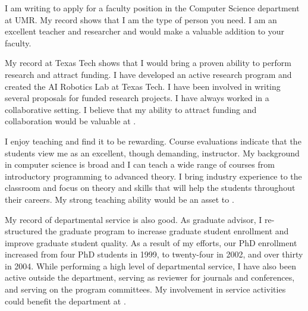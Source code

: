 

I am writing to apply for a faculty position in the Computer Science
 department at UMR.  My record
shows that I am the type of person you need.  I am an excellent teacher and
researcher and would make a valuable addition to your faculty.

\thecustom

My record at Texas Tech shows that I would bring a proven ability to perform
research and attract funding.  I have developed an active research program
and created the AI Robotics Lab at Texas Tech.  I have been involved in
writing several proposals for funded research projects.  I have always
worked in a collaborative setting.  I believe that my ability to attract
funding and collaboration would be valuable at \place.

I enjoy teaching and find it to be rewarding.    Course evaluations
indicate that the students view me as an excellent, though demanding,
instructor.  My background in computer science is broad and I can teach a
wide range of courses from introductory programming to advanced theory.  I
bring industry experience to the classroom and focus on theory and skills
that will help the students throughout their careers.  My strong teaching
ability would be an asset to \place.

My record of departmental service is also good.  As graduate advisor, I
re-structured the graduate program to increase graduate student enrollment
and improve graduate student quality.  As a result of my efforts, our PhD
enrollment increased from four PhD students in 1999,
to twenty-four in 2002, and over thirty in 2004.
While performing a high level of departmental service, I have also been
active outside the department, serving as reviewer for journals and
conferences, and serving on the program committees. My
involvement in service activities could benefit the department at \place.

